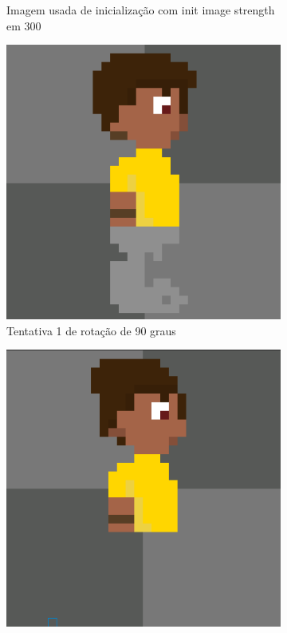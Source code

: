 \begin{figure}[htbp]
\begin{subfigure}{0.24\linewidth}
        \caption{\small Imagem usada de inicialização com init image strength em 300}
        \label{fig:pixelLabRotacao10b}
    \end{subfigure}
    \begin{subfigure}{0.24\linewidth}
        \includegraphics[width=1\linewidth]{figs/pixelLab/dia2/rot45fix3init1res1.PNG}
        \caption{\small Tentativa 1 de rotação de 90 graus}
        \label{fig:pixelLabRotacao10c}
    \end{subfigure}
    \begin{subfigure}{0.24\linewidth}
        \includegraphics[width=1\linewidth]{figs/pixelLab/dia2/rot45fix3init1res2.PNG}

\end{subfigure}
\end{figure}
